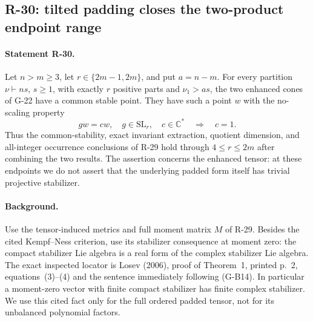 \subsection{R-30: tilted padding closes the two-product endpoint range}

\paragraph{Statement R-30.}
Let $n>m\geq3$, let $r\in\{2m-1,2m\}$, and put $a=n-m$.
For every partition $\nu\vdash ns$, $s\geq1$, with exactly
$r$ positive parts and $\nu_1>as$, the two enhanced cones of
G-22 have a common stable point. They have such a point $w$
with the no-scaling property
\[
 g w=cw,\quad g\in\mathrm{SL}_r,\quad c\in\mathbb C^*
       \quad\Longrightarrow\quad c=1.
\]
Thus the common-stability, exact invariant extraction, quotient
 dimension, and all-integer occurrence conclusions of R-29 hold
through $4\leq r\leq2m$ after combining the two results.
The assertion concerns the enhanced tensor: at these endpoints
we do not assert that the underlying padded form itself has
trivial projective stabilizer.

\paragraph{Background.}
Use the tensor-induced metrics and full moment matrix $M$
of R-29. Besides the cited Kempf--Ness criterion, use its
stabilizer consequence at moment zero: the compact stabilizer
Lie algebra is a real form of the complex stabilizer Lie algebra.
The exact inspected locator is Losev (2006), proof of Theorem~1,
printed p.~2, equations~(3)--(4) and the sentence immediately
following (G-B14). In particular a moment-zero vector with
finite compact stabilizer has finite complex stabilizer.
We use this cited fact only for the full ordered padded tensor,
not for its unbalanced polynomial factors.

